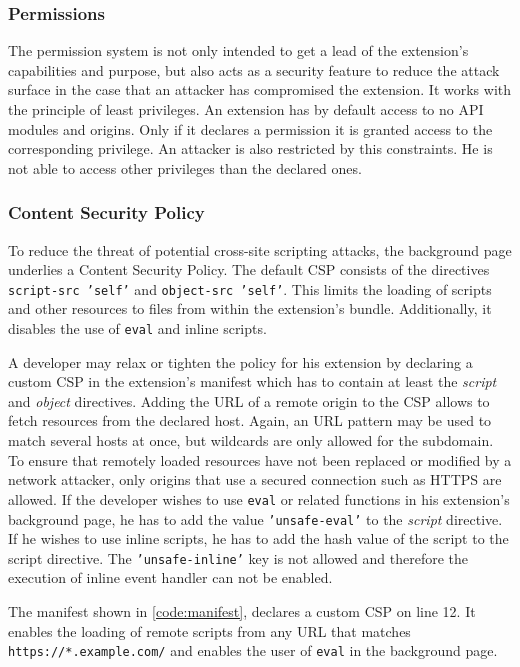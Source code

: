 \subsubsection{Permissions}

	The permission system is not only intended to get a lead of the extension's capabilities and purpose, but also acts as a security feature to reduce the attack surface in the case that an attacker has compromised the extension. It works with the principle of least privileges. An extension has by default access to no API modules and origins. Only if it declares a permission it is granted access to the corresponding privilege. An attacker is also restricted by this constraints. He is not able to access other privileges than the declared ones. 
	
\subsubsection{Content Security Policy}

	To reduce the threat of potential cross-site scripting attacks, the background page underlies a Content Security Policy. The default CSP consists of the directives \texttt{script-src 'self'} and \texttt{object-src 'self'}. This limits the loading of scripts and other resources to files from within the extension's bundle. Additionally, it disables the use of \texttt{eval} and inline scripts.  
	
	A developer may relax or tighten the policy for his extension by declaring a custom CSP in the extension's manifest which has to contain at least the \textit{script} and \textit{object} directives. Adding the URL of a remote origin to the CSP allows to fetch resources from the declared host. Again, an URL pattern may be used to match several hosts at once, but wildcards are only allowed for the subdomain. To ensure that remotely loaded resources have not been replaced or modified by a network attacker, only origins that use a secured connection such as HTTPS are allowed. If the developer wishes to use \texttt{eval} or related functions in his extension's background page, he has to add the value \texttt{'unsafe-eval'} to the \textit{script} directive. If he wishes to use inline scripts, he has to add the hash value of the script to the script directive. The \texttt{'unsafe-inline'} key is not allowed and therefore the execution of inline event handler can not be enabled. 
	
	The manifest shown in \autoref{code:manifest}, declares a custom CSP on line 12. It enables the loading of remote scripts from any URL that matches \texttt{https://*.example.com/} and enables the user of \texttt{eval} in the background page.

